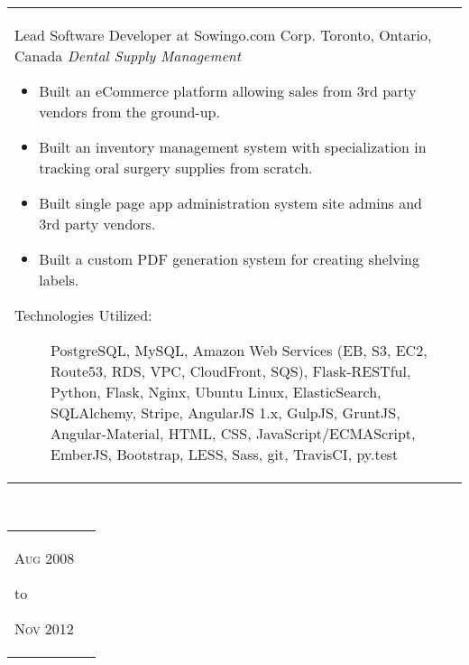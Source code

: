 {{{{{{{{{{{\begin{tabular}{ R{1.5cm} | p{10.5cm} }
            Lead Software Developer at Sowingo.com Corp.\newline
            Toronto, Ontario, Canada\newline
            \emph{Dental Supply Management} \newline
            \fontsize{9pt}{10pt}\selectfont
            \begin{itemize}
                \item Built an eCommerce platform allowing sales from 3rd party vendors from the ground-up.
                \item Built an inventory management system with specialization in tracking oral surgery supplies from scratch.
                \item Built single page app administration system site admins and 3rd party vendors.
                \item Built a custom PDF generation system for creating shelving labels.
            \end{itemize}
            \bigskip
            \begin{description}
                \item[Technologies Utilized:]
                    PostgreSQL, MySQL, Amazon Web Services (EB, S3, EC2,
                    Route53, RDS, VPC, CloudFront, SQS), Flask-RESTful, Python,
                    Flask, Nginx, Ubuntu Linux, ElasticSearch, SQLAlchemy,
                    Stripe, AngularJS 1.x, GulpJS, GruntJS, Angular-Material,
                    HTML, CSS, JavaScript/ECMAScript, EmberJS, Bootstrap, LESS,
                    Sass, git, TravisCI, py.test
            \end{description}
        \end{tabular}
        \\
        \begin{tabular}{ R{1.5cm} | p{10.5cm} }
            \hfill \textsc{Aug 2008}\newline
            \begin{center} to \end{center}
            \hfill \textsc{Nov 2012} &


\end{tabular}}}}}}}}}}}}
